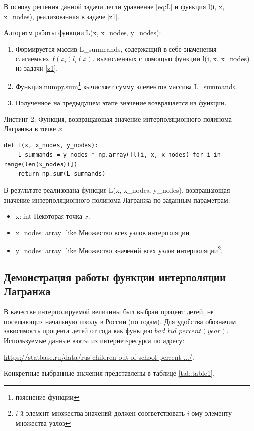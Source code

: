 В основу решения данной задачи легли уравнение \eqref{eq:L} и функция l(i, x, x\_nodes), реализованная в задаче \ref{z1}.

Алгоритм работы функции L(x, x\_nodes, y\_nodes):
\begin{enumerate}
    \item Формируется массив L\_summands, содержащий в себе значенения слагаемыех $f(x_i)l_i(x)$, вычисленных с помощью функции l(i, x, x\_nodes) из задачи \ref{z1}.
    \item Функция numpy.sum\footnote{пояснение функции} вычисляет сумму элементов массива L\_summands.
    \item Полученное на предыдущем этапе значение возвращается из функции.
\end{enumerate}

Листинг 2: Функция, возвращающая значение интерполяционного полинома Лагранжа в точке $x$.
\begin{lstlisting}[label={lst:listing2}]
def L(x, x_nodes, y_nodes):
    L_summands = y_nodes * np.array([l(i, x, x_nodes) for i in range(len(x_nodes))])
    return np.sum(L_summands)
\end{lstlisting}

В результате реализована функция L(x, x\_nodes, y\_nodes), возвращающая значение интерполяционного полинома Лагранжа по заданным параметрам:
\begin{itemize}
    \item x: int
    \quad Некоторая точка $x$.
    \item x\_nodes: array\_like
    \quad Множество всех узлов интерполяции.
    \item y\_nodes: array\_like
    \quad Множество значений всех узлов интерполяции\footnote{$i$-й элемент множества значений должен соответствовать $i$-ому элементу множества узлов}.
\end{itemize}

\subsection{Демонстрация работы функции интерполяции Лагранжа}
\label{z3}

В качестве интерполируемой величины был выбран процент детей, не посещающих начальную школу в России (по годам). Для удобства обозначим зависимость процента детей от года как функцию $bad\_kid\_percent(year)$. Используемые данные взяты из интернет-ресурса по адресу:
\begin{center}
    \href{https://statbase.ru/data/rus-children-out-of-school-percent-of-primary-school-age/}{https://statbase.ru/data/rus-children-out-of-school-percent-.../}.
\end{center}
Конкретные выбранные значения представлены в таблице \ref{tab:table1}.

